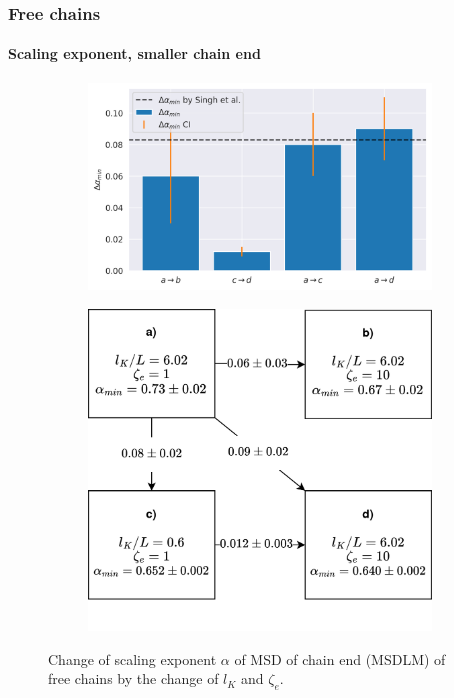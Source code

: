 \documentclass[handout]{beamer}
\begin{document}

\begin{frame}
    \frametitle{Free chains}
    \framesubtitle{Scaling exponent, smaller chain end}
    \begin{figure}
        \centering
        \begin{subfigure}{0.58\textwidth}
            \centering
            \includegraphics[width=\textwidth]{17+18+19+20-exp-delta_alpha_min_fm.png}
        \end{subfigure}
        \begin{subfigure}{0.4\textwidth}
            \centering
            \includegraphics[width=\textwidth]{cases_diag.png}
        \end{subfigure}
        \caption{
            Change of scaling exponent $\alpha$ of MSD of chain end (MSDLM)
            of free chains by the change of $l_K$ and $\zeta_e$.
        }
    \end{figure}
\end{frame}
\end{document}
